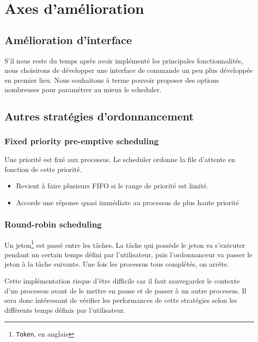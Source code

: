 \documentclass[a4paper,11pt,final]{report}
\begin{document}
\chapter{Axes d'amélioration}
    
    \section{Amélioration d'interface}

    S'il nous reste du temps après avoir implémenté les principales fonctionnalités, nous choisirons de développer une interface de commande un peu plus développée en premier lieu. Nous souhaitons à terme pouvoir proposer des options nombreuses pour paramétrer au mieux le scheduler.

    \section{Autres stratégies d'ordonnancement}
    
    \subsection{Fixed priority pre-emptive scheduling}
        Une priorité est fixé aux processus. Le scheduler ordonne la file d'attente en fonction de cette priorité. 
        \begin{itemize}
            \item Revient à faire plusieurs FIFO si le range de priorité est limité.
            \item Accorde une réponse quasi immédiate au processus de plus haute priorité
        \end{itemize}
    \subsection{Round-robin scheduling}
        Un jeton\footnote{\texttt{Token}, en anglais} est passé entre les tâches. La tâche qui possède le jeton va s'exécuter pendant un certain temps défini par l'utilisateur, puis l'ordonnanceur va passer le jeton à la tâche suivante. Une fois les processus tous complétés, on arrête.
        
        Cette implémentation risque d'être difficile car il faut sauvegarder le contexte d'un processus avant de le mettre en pause et de passer à un autre processus. Il sera donc intéressant de vérifier les performances de cette stratégies selon les différents temps définis par l'utilisateur.
    
\end{document}
